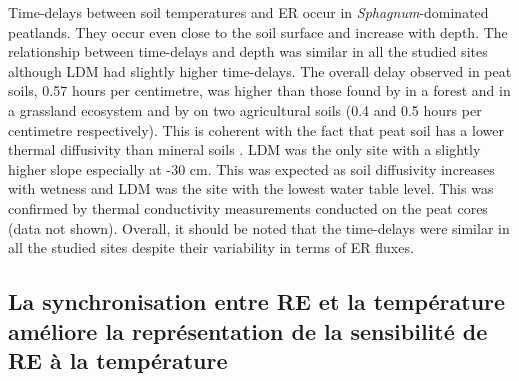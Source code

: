 Time-delays between soil temperatures and ER occur in \textit{Sphagnum}-dominated peatlands.
They occur even close to the soil surface and increase with depth.
The relationship between time-delays and depth was similar in all the studied sites although LDM had slightly higher time-delays.
The overall delay observed in peat soils, 0.57 hours per centimetre, was higher than those found by \citet{pavelka2007} in a forest and in a grassland ecosystem and by \citet{parkin2003} on two agricultural soils (0.4 and 0.5 hours per centimetre respectively).
This is coherent with the fact that peat soil has a lower thermal diffusivity than mineral soils \citep{farouki1981,arya2001}.
LDM was the only site with a slightly higher slope especially at -30 cm.
This was expected as soil diffusivity increases with wetness \citep{hillel2003} and LDM was the site with the lowest water table level.
This was confirmed by thermal conductivity measurements conducted on the peat cores (data not shown).
Overall, it should be noted that the time-delays were similar in all the studied sites despite their variability in terms of ER fluxes.

\subsection{La synchronisation entre RE et la température améliore la représentation de la sensibilité de RE à la température}



